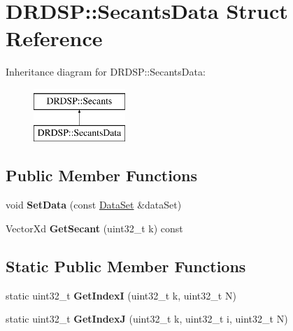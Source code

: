 \hypertarget{struct_d_r_d_s_p_1_1_secants_data}{\section{D\-R\-D\-S\-P\-:\-:Secants\-Data Struct Reference}
\label{struct_d_r_d_s_p_1_1_secants_data}
}
Inheritance diagram for D\-R\-D\-S\-P\-:\-:Secants\-Data\-:\begin{figure}[H]
\begin{center}
\leavevmode
\includegraphics[height=2.000000cm]{struct_d_r_d_s_p_1_1_secants_data}
\end{center}
\end{figure}
\subsection*{Public Member Functions}
\begin{DoxyCompactItemize}
\item 
\hypertarget{struct_d_r_d_s_p_1_1_secants_data_a1c1383e3f4eca99473eba63d7a50a024}{void {\bfseries Set\-Data} (const \hyperlink{struct_d_r_d_s_p_1_1_data_set}{Data\-Set} \&data\-Set)}\label{struct_d_r_d_s_p_1_1_secants_data_a1c1383e3f4eca99473eba63d7a50a024}

\item 
\hypertarget{struct_d_r_d_s_p_1_1_secants_data_a7b94a05552fbbf08335ff1d4270ef13a}{Vector\-Xd {\bfseries Get\-Secant} (uint32\-\_\-t k) const }\label{struct_d_r_d_s_p_1_1_secants_data_a7b94a05552fbbf08335ff1d4270ef13a}

\end{DoxyCompactItemize}
\subsection*{Static Public Member Functions}
\begin{DoxyCompactItemize}
\item 
\hypertarget{struct_d_r_d_s_p_1_1_secants_data_abd9b205c7f0555f87195b241225e988b}{static uint32\-\_\-t {\bfseries Get\-Index\-I} (uint32\-\_\-t k, uint32\-\_\-t N)}\label{struct_d_r_d_s_p_1_1_secants_data_abd9b205c7f0555f87195b241225e988b}

\item 
\hypertarget{struct_d_r_d_s_p_1_1_secants_data_a7a609eef6b36cdd56d4920e312cc310e}{static uint32\-\_\-t {\bfseries Get\-Index\-J} (uint32\-\_\-t k, uint32\-\_\-t i, uint32\-\_\-t N)}\label{struct_d_r_d_s_p_1_1_secants_data_a7a609eef6b36cdd56d4920e312cc310e}

\end{DoxyCompactItemize}
